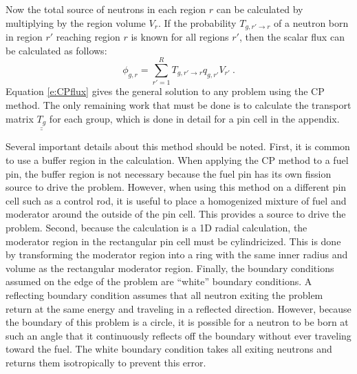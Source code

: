 Now the total source of neutrons in each region $r$ can be calculated by multiplying by the region volume $V_r$.  If the probability $T_{g,r'\rightarrow r}$ of a neutron born in region $r'$ reaching region $r$ is known for all regions $r'$, then the scalar flux can be calculated as follows:
\begin{equation}\label{e:CPflux}
\phi_{g,r} = \sum_{r'=1}^R T_{g,r'\rightarrow r} q_{g,r'} V_{r'}\ .
\end{equation}
Equation \ref{e:CPflux} gives the general solution to any problem using the CP method.  The only remaining work that must be done is to calculate the transport matrix $\underline{\underline{T_g}}$ for each group, which is done in detail for a pin cell in the appendix.

Several important details about this method should be noted.  First, it is 
common to use a buffer region in the calculation.  When applying the CP method 
to a fuel pin, the buffer region is not necessary because the fuel pin has its 
own fission source to drive the problem.  However, when using this method on a 
different pin cell such as a control rod, it is useful to place a homogenized 
mixture of fuel and moderator around the outside of the pin cell.  This 
provides a source to drive the problem.  Second, because the calculation is a 
1D radial calculation, the moderator region in the rectangular pin cell must be 
cylindricized.  This is done by transforming the moderator region into a ring 
with the same inner radius and volume as the rectangular moderator region.  
Finally, the boundary conditions assumed on the edge of the problem are 
``white'' boundary conditions.  A reflecting boundary condition assumes that 
all neutron exiting the problem return at the same energy and traveling in a 
reflected direction.  However, because the boundary of this problem is a 
circle, it is possible for a neutron to be born at such an angle that it 
continuously reflects off the boundary without ever traveling toward the fuel.  
The white boundary condition takes all exiting neutrons and returns them 
isotropically to prevent this error.